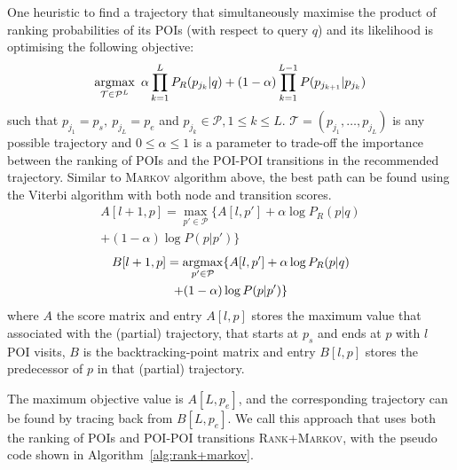 One heuristic to find a trajectory that simultaneously maximise the product of ranking probabilities
of its POIs (with respect to query $q$) and its likelihood is optimising the following objective:
\begin{equation*}
    \operatorname*{argmax}_{\mathcal{T} \in \mathcal{P}^L} ~\alpha \prod_{k=1}^{L} P_R(p_{j_k} | q) +
                                     (1-\alpha) \prod_{k=1}^{L-1} P(p_{j_{k+1}} | p_{j_k})
\end{equation*}
such that
$p_{j_1} = p_s, ~ p_{j_L} = p_e$ and
$p_{j_k} \in \mathcal{P}, 1 \le k \le L$.
$\mathcal{T} = (p_{j_1}, \dots, p_{j_L})$ is any possible trajectory and
$0 \le \alpha \le 1$ is a parameter to trade-off the importance between the ranking of POIs
and the POI-POI transitions in the recommended trajectory.
Similar to \textsc{Markov} algorithm above, the best path can be found using the Viterbi algorithm with both node and transition scores. 
\begin{multline}
    \label{eq:max}
    A[l+1, p] = \max_{p' \in \mathcal{P}} \{ A[l, p'] + \alpha \log P_R(p|q) \\ + (1-\alpha) \log P(p|p') \}
\end{multline}
\begin{multline}
    \label{eq:argmax}
    B[l+1, p] = \operatorname*{argmax}_{p' \in \mathcal{P}} \{ A[l, p'] + \alpha \log P_R(p|q) \\ + (1-\alpha) \log P(p|p') \}
\end{multline}
where $A$ the score matrix and entry $A[l, p]$ stores the maximum value that associated with the (partial) trajectory, 
that starts at $p_s$ and ends at $p$ with $l$ POI visits,
$B$ is the backtracking-point matrix and entry $B[l, p]$ stores the predecessor of $p$ in that (partial) trajectory.

The maximum objective value is $A[L, p_e]$,
and the corresponding trajectory can be found by tracing back from $B[L, p_e]$.
We call this approach that uses both the ranking of POIs and POI-POI transitions \textsc{Rank+Markov},
with the pseudo code shown in Algorithm~\ref{alg:rank+markov}.

